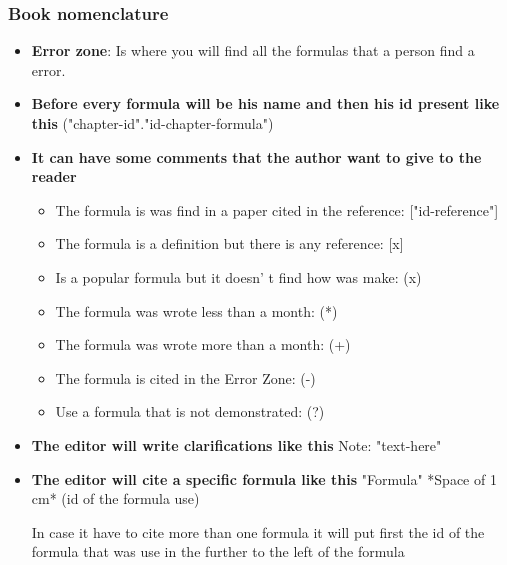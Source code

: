 \documentclass{book}
\begin{document}
                \subsubsection{Book nomenclature}
                    \begin{itemize}
                        \item \textbf{Error zone}: Is where you will find all the formulas that a person find a error.
                        
                        \item \textbf{Before every formula will be his name and then his id present like this} ("chapter-id"."id-chapter-formula") 
                        
                        \item \textbf{It can have some comments that the author want to give to the reader}
    
                        \begin{itemize}
                            \item The formula is was find in a paper cited in the reference: ["id-reference"]
        
                            \item The formula is a definition but there is any reference: [x]
    
                            \item Is a popular formula but it doesn’ t find how was make: (x)
        
                            \item The formula was wrote less than a month: (*)
        
                            \item The formula was wrote more than a month: (+)
                            
                            \item The formula is cited in the Error Zone: (-)
    
                            \item Use a formula that is not demonstrated: (?)
                        \end{itemize}

                    \item \textbf{The editor will write clarifications like this} Note: "text-here"

                    \item \textbf{The editor will cite a specific formula like this} "Formula" *Space of 1 cm* (id of the formula use) 

                    In case it have to cite more than one formula it will put first the id of the formula that was use in the further to the left of the formula
                    \end{itemize}
\end{document}
